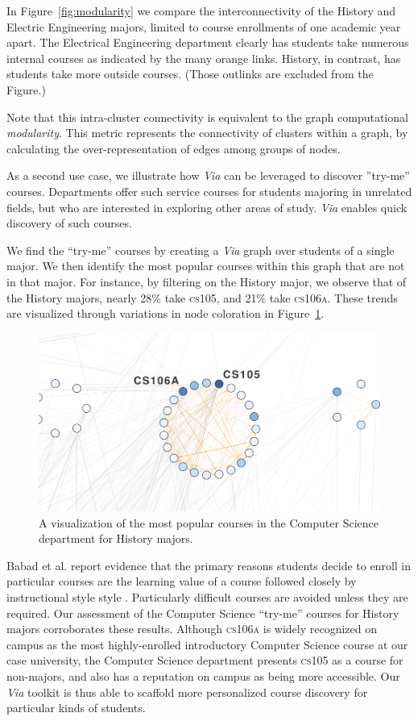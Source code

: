 In Figure~\ref{fig:modularity} we compare the interconnectivity of
the History and Electric Engineering majors, limited to course
enrollments of one academic year apart. The Electrical Engineering
department clearly has students take numerous internal courses as
indicated by the many orange links. History, in contrast, has students
take more outside courses. (Those outlinks are excluded from the
Figure.)

Note that this intra-cluster connectivity is equivalent to the graph
computational {\em modularity}. This metric represents the connectivity
of clusters within a graph, by calculating the over-representation of
edges among groups of nodes.

As a second use case, we illustrate how \textit{Via} can be leveraged
to discover ''try-me'' courses. Departments offer such service courses
for students majoring in unrelated fields, but who are interested in
exploring other areas of study. {\em Via} enables quick discovery of
such courses.

We find the ``try-me'' courses by creating a {\em Via} graph over
students of a single major. We then identify the most popular courses
within this graph that are not in that major. For instance,
by filtering on the History major, we observe that of the History
majors, nearly 28\% take \textsc{cs105}, and 21\% take
\textsc{cs106a}. These trends are visualized through variations in
node coloration in Figure~\ref{fig:history-try-me}.

\begin{figure}[h]
    \centering
    \includegraphics[width=.9\columnwidth]{Figs/final-history-try-me.pdf}
    \caption{A visualization of the most popular courses in the Computer Science department for History majors.}
    \label{fig:history-try-me}
\end{figure}

 Babad et al. report evidence that the primary reasons students decide
 to enroll in particular courses are the learning value of a course
 followed closely by instructional style style \cite{Babad2003}. Particularly difficult courses are avoided unless they are required. Our assessment of the Computer Science ``try-me'' courses for History majors corroborates these results. Although \textsc{cs106a} is widely recognized on campus as the most highly-enrolled introductory Computer Science course at our case university, the Computer Science department presents \textsc{cs105} as a course for non-majors, and also has a reputation on campus as being more accessible. Our \textit{Via} toolkit is thus able to scaffold more personalized course discovery
 for particular kinds of students.
 
